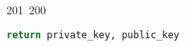 201~200~\documentclass{article}
\begin{document}
\begin{lstlisting}[language=Python, caption=Key Pair Generation]
	                                                                                                                                                                                                                                                                                                	                                                                                                                                        	    	                                                                                                	                                                                                                                                                                                                                                                                                                                                	                                                                        	                                                                        	                                                                                                                                        	                                                                                                                                                                                                return private_key, public_key


\end{lstlisting}
\end{document}
